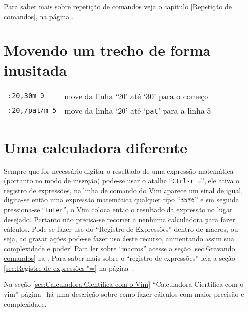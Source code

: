 {\Large {}} Para saber mais sobre repetição de comandos veja o capítulo
\ref{Repetição de comandos}, na página \pageref{Repetição de comandos}.

\section{Movendo um trecho de forma inusitada}
\label{Movendo um trecho de forma inusitada}

\begin{table}[htb]\begin{center} \begin{tabular}{ll} \hline
     \verb|:20,30m 0| & move da linha `20' até `30' para o começo\\
     \verb|:20,/pat/m 5| & move da linha `20' até `\verb|pat|' para a linha 5\\
\hline \end{tabular}\end{center}\end{table}

\section{Uma calculadora diferente}
\label{Uma calculadora diferente}

Sempre que for necessário digitar  o resultado de uma expressão matemática
(portanto no modo de inserção) pode-se usar o atalho ``{\tt Ctrl-r =}'', ele
ativa o registro de expressões, na linha de comando do Vim aparece um sinal de
igual, digita-se então uma expressão matemática qualquer tipo ``{\tt 35*6}'' e
em seguida pressiona-se ``{\tt Enter}'', o Vim coloca então o resultado da
expressão no lugar desejado.  Portanto não precisa-se recorrer a nenhuma
calculadora para fazer cálculos.  Pode-se fazer uso do ``Registro de
Expressões'' dentro de macros, ou seja, ao gravar ações pode-se fazer uso deste
recurso, aumentando assim sua complexidade e poder! Para ler sobre ``macros''
acesse a seção \ref{sec:Gravando comandos} na \pageref{sec:Gravando comandos}.
Para saber mais sobre o ``registro de expressões'' leia a seção
\ref{sec:Registro de expressões "=} na página~\pageref{sec:Registro de expressões "=}.

{\Large {}} Na seção \ref{sec:Calculadora Científica com o Vim}
``Calculadora Científica com o vim'' página~\pageref{sec:Calculadora Científica com
o Vim} há uma descrição sobre como fazer cálculos com maior precisão e
complexidade.

